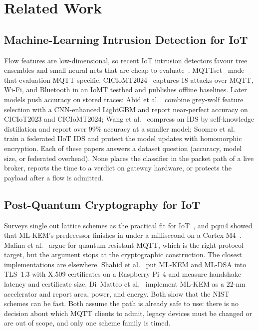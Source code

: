\documentclass[journal]{IEEEtran}
\begin{document}
\section{Related Work}
\label{sec:related}

\subsection{Machine-Learning Intrusion Detection for IoT}

Flow features are low-dimensional, so recent IoT intrusion detectors favour tree ensembles and small neural nets that are cheap to evaluate~\cite{iot_ids_survey}. MQTTset~\cite{mqtt_ids_ml} made that evaluation MQTT-specific. CICIoMT2024~\cite{ciciomt2024} captures 18 attacks over MQTT, Wi-Fi, and Bluetooth in an IoMT testbed and publishes offline baselines. Later models push accuracy on stored traces: Abid et al.~\cite{abid2025gwo} combine grey-wolf feature selection with a CNN-enhanced LightGBM and report near-perfect accuracy on CICIoT2023 and CICIoMT2024; Wang et al.~\cite{wang2025skd} compress an IDS by self-knowledge distillation and report over 99\% accuracy at a smaller model; Soomro et al.~\cite{soomro2025roche} train a federated IIoT IDS and protect the model updates with homomorphic encryption. Each of these papers answers a dataset question (accuracy, model size, or federated overhead). None places the classifier in the packet path of a live broker, reports the time to a verdict on gateway hardware, or protects the payload after a flow is admitted.

\subsection{Post-Quantum Cryptography for IoT}

Surveys single out lattice schemes as the practical fit for IoT~\cite{pqc_iot_survey}, and pqm4 showed that ML-KEM's predecessor finishes in under a millisecond on a Cortex-M4~\cite{kyber_arm}. Malina et al.~\cite{malina2024mqttpqc} argue for quantum-resistant MQTT, which is the right protocol target, but the argument stops at the cryptographic construction. The closest implementations are elsewhere. Shahid et al.~\cite{shahid2026pqtls} put ML-KEM and ML-DSA into TLS~1.3 with X.509 certificates on a Raspberry Pi~4 and measure handshake latency and certificate size. Di~Matteo et al.~\cite{dimatteo2026kem22} implement ML-KEM as a 22-nm accelerator and report area, power, and energy. Both show that the NIST schemes can be fast. Both assume the path is already safe to use: there is no decision about which MQTT clients to admit, legacy devices must be changed or are out of scope, and only one scheme family is timed.
\end{document}
